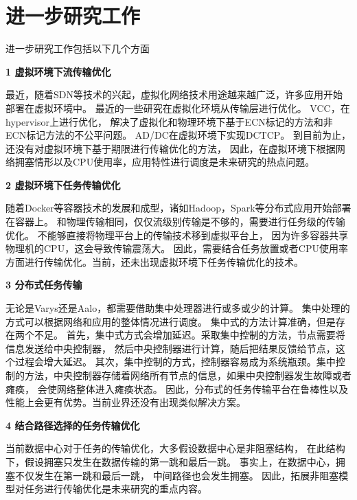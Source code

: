 \section{进一步研究工作}
进一步研究工作包括以下几个方面

\textbf{1 虚拟环境下流传输优化}

最近，随着SDN等技术的兴起，虚拟化网络技术用途越来越广泛，许多应用开始部署在虚拟环境中。
最近的一些研究\cite{He2016AC,Cronkite2016Virtualized}在虚拟化环境从传输层进行优化。
VCC\cite{Cronkite2016Virtualized}，在hypervisor上进行优化，
解决了虚拟化和物理环境下基于ECN标记的方法和非ECN标记方法的不公平问题。
AD/DC\cite{He2016AC}在虚拟环境下实现DCTCP。
到目前为止，还没有对虚拟环境下基于期限进行传输优化的方法，
因此，在虚拟环境下根据网络拥塞情形以及CPU使用率，应用特性进行调度是未来研究的热点问题。



\textbf{2 虚拟环境下任务传输优化}

随着Docker等容器技术的发展和成型，诸如Hadoop，Spark等分布式应用开始部署在容器上。
和物理传输相同，仅仅流级别传输是不够的，需要进行任务级的传输优化。
不能够直接将物理平台上的传输技术移到虚拟平台上，
因为许多容器共享物理机的CPU，这会导致传输震荡大。
因此，需要结合任务放置或者CPU使用率方面进行传输优化。当前，还未出现虚拟环境下任务传输优化的技术。


\textbf{3 分布式任务传输}

无论是Varys还是Aalo，都需要借助集中处理器进行或多或少的计算。
集中处理的方式可以根据网络和应用的整体情况进行调度。
集中式的方法计算准确，但是存在两个不足。
首先，集中式方式会增加延迟。采取集中控制的方法，节点需要将信息发送给中央控制器，
然后中央控制器进行计算，随后把结果反馈给节点，这个过程会增大延迟。
其次，集中控制的方式，控制器容易成为系统瓶颈。集中控制的方法，中央控制器存储着网络所有节点的信息，如果中央控制器发生故障或者瘫痪，
会使网络整体进入瘫痪状态。
因此，分布式的任务传输平台在鲁棒性以及性能上会更有优势。当前业界还没有出现类似解决方案。




\textbf{4 结合路径选择的任务传输优化}

当前数据中心对于任务的传输优化，大多假设数据中心是非阻塞结构，
在此结构下，假设拥塞只发生在数据传输的第一跳和最后一跳。
事实上，在数据中心，拥塞不仅发生在第一跳和最后一跳，
中间路径也会发生拥塞。
因此，拓展非阻塞模型对任务进行传输优化是未来研究的重点内容。


